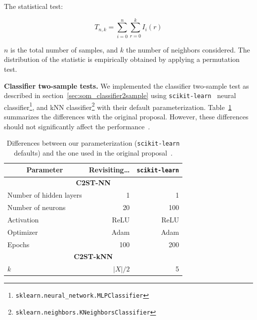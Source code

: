 The statistical test:

\begin{equation}
    T_{n,k} = \sum_{i=0}^{n}\sum_{r=0}^{k} I_i(r)
\end{equation}

$n$ is the total number of samples, and $k$ the number of neighbors considered.
The distribution of the statistic is empirically obtained by applying a permutation test.
 
\textbf{Classifier two-sample tests.}
We implemented the classifier two-sample test as described in section~\ref{sec:som_classifier2sample}
using \texttt{scikit-learn}~\cite{scikit-learn} neural
classifier\footnote{\texttt{sklearn.neural\_network.MLPClassifier}},
and \gls{kNN} classifier\footnote{\texttt{sklearn.neighbors.KNeighborsClassifier}}
with their default parameterization. Table~\ref{tab:classifier_diff} summarizes the differences with the original proposal. However, these differences should not significantly affect the performance~\cite{lopez2016revisiting}.

\begin{table}[htpb]
\centering
\begin{tabular}{lrr}
\multicolumn{1}{c}{\bfseries Parameter}       & \bfseries Revisiting\ldots & \texttt{scikit-learn}     \\ \hline
\multicolumn{3}{c}{\bfseries C2ST-NN} \\
Number of hidden layers &  1     &   1    \\
Number of neurons       & 20     & 100    \\
Activation              & ReLU   & ReLU   \\
Optimizer               & Adam   & Adam   \\
Epochs                  & 100    & 200    \\
\multicolumn{3}{c}{\bfseries C2ST-kNN} \\
$k$                     & $|X|/2$ & 5 \\
\end{tabular}
\caption[Differences between our parameterization.]{
    Differences between our parameterization (\texttt{scikit-learn} defaults) and the one
    used in the original proposal~\cite{lopez2016revisiting}.
}
\label{tab:classifier_diff}
\end{table}

